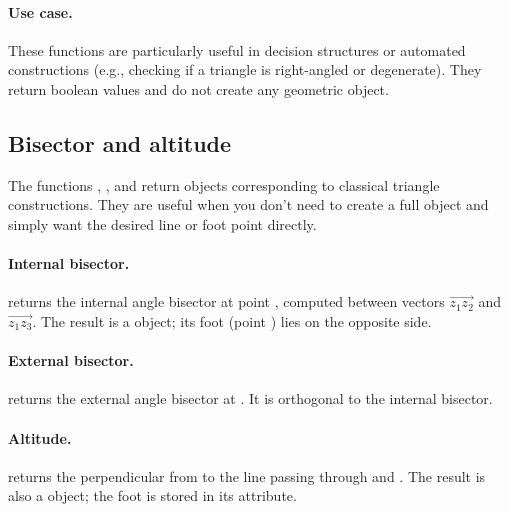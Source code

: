 \paragraph{Use case.}
These functions are particularly useful in decision structures or automated constructions (e.g., checking if a triangle is right-angled or degenerate). They return boolean values and do not create any geometric object.



\subsection{Bisector and altitude} %
\label{sub:bisector_and_altitude}

The functions , , and  return  objects corresponding to classical triangle constructions. They are useful when you don't need to create a full  object and simply want the desired line or foot point directly.

\paragraph{Internal bisector.}
 returns the internal angle bisector at point , computed between vectors $\overrightarrow{z_1z_2}$ and $\overrightarrow{z_1z_3}$. The result is a  object; its foot (point ) lies on the opposite side.

\paragraph{External bisector.}
 returns the external angle bisector at . It is orthogonal to the internal bisector.

\paragraph{Altitude.}
 returns the perpendicular from  to the line passing through  and . The result is also a  object; the foot is stored in its  attribute.

